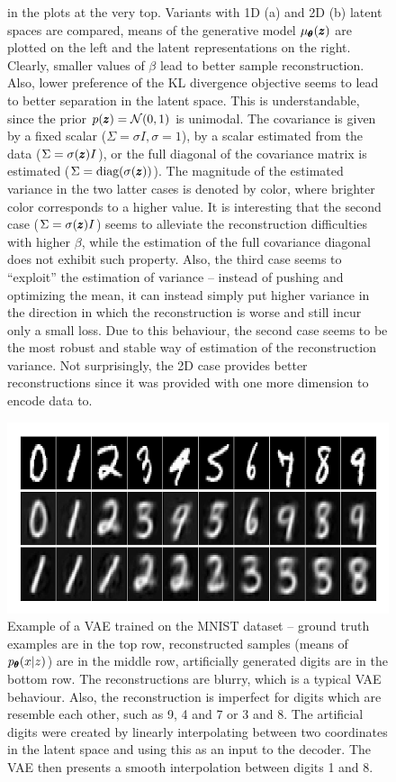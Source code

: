 \begin{figure}
{in the plots at the very top. Variants with 1D (a) and 2D (b) latent
spaces are compared, means of the generative model $\mu_{\pmb{{\theta}}}(\pmb{{z}})$
are plotted on the left and the latent representations on the right.
Clearly, smaller values of $\beta$ lead to better sample reconstruction.
Also, lower preference of the KL divergence objective seems to lead
to better separation in the latent space. This is understandable,
since the prior $p(\pmb{{z}})=\mathcal{N}(0,1)$ is unimodal. The covariance
is given by a fixed scalar ($\Sigma=\sigma I,\sigma=1$), by a scalar
estimated from the data ($\Sigma=\sigma(\pmb{{z}})I$), or the full diagonal
of the covariance matrix is estimated ($\Sigma=\text{diag}(\sigma(\pmb{{z}}))$).
The magnitude of the estimated variance in the two latter cases is
denoted by color, where brighter color corresponds to a higher value.
It is interesting that the second case ($\Sigma=\sigma(\pmb{{z}})I$) seems
to alleviate the reconstruction difficulties with higher $\beta$,
while the estimation of the full covariance diagonal does not exhibit
such property. Also, the third case seems to ``exploit'' the estimation
of variance -- instead of pushing and optimizing the mean, it can
instead simply put higher variance in the direction in which the reconstruction
is worse and still incur only a small loss. Due to this behaviour,
the second case seems to be the most robust and stable way of estimation
of the reconstruction variance. Not surprisingly, the 2D case provides
better reconstructions since it was provided with one more dimension
to encode data to.}
\label{fig:betavae}
\end{figure}

\begin{figure}
\centering{}\includegraphics[scale=0.8]{data/chapter_survey/mnist_reconstruction_generation}\caption{Example of a VAE trained on the MNIST dataset -- ground truth examples
are in the top row, reconstructed samples (means of $p_{\pmb{{\theta}}}(x|z)$)
are in the middle row, artificially generated digits are in the bottom
row. The reconstructions are blurry, which is a typical VAE behaviour.
Also, the reconstruction is imperfect for digits which are resemble
each other, such as 9, 4 and 7 or 3 and 8. The artificial digits were
created by linearly interpolating between two coordinates in the latent
space and using this as an input to the decoder. The VAE then presents
a smooth interpolation between digits 1 and 8.}
\label{fig:mnist_reconstruction}
\end{figure}
 
